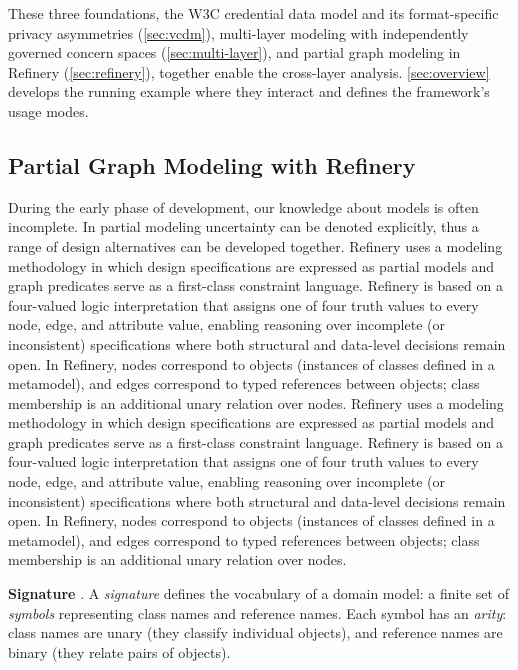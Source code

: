 These three foundations, the W3C credential data model and its format-specific privacy asymmetries (\autoref{sec:vcdm}), multi-layer modeling with independently governed concern spaces (\autoref{sec:multi-layer}), and partial graph modeling in Refinery (\autoref{sec:refinery}), together enable the cross-layer analysis. \autoref{sec:overview} develops the running example where they interact and defines the framework's usage modes.

\subsection{Partial Graph Modeling with Refinery}\label{sec:refinery}

During the early phase of development, our knowledge about models is often incomplete. In partial modeling \citep{famelisPartialModelsModeling2012} uncertainty can be denoted explicitly, thus a range of design alternatives can be developed together.
Refinery \citep{marussy_refinery_2024} uses a modeling methodology in which design specifications are expressed as partial models and graph predicates serve as a first-class constraint language. Refinery is based on a four-valued logic interpretation \citep{Belnap77useful} that assigns one of four truth values to every node, edge, and attribute value, enabling reasoning over incomplete (or inconsistent) specifications where both structural and data-level decisions remain open. In Refinery, nodes correspond to objects (instances of classes defined in a metamodel), and edges correspond to typed references between objects; class membership is an additional unary relation over nodes.
Refinery \citep{marussy_refinery_2024} uses a modeling methodology in which design specifications are expressed as partial models and graph predicates serve as a first-class constraint language. Refinery is based on a four-valued logic interpretation \citep{Belnap77useful} that assigns one of four truth values to every node, edge, and attribute value, enabling reasoning over incomplete (or inconsistent) specifications where both structural and data-level decisions remain open. In Refinery, nodes correspond to objects (instances of classes defined in a metamodel), and edges correspond to typed references between objects; class membership is an additional unary relation over nodes.

\textbf{Signature} \citep{marussy_refinery_2024}. A \emph{signature} defines the vocabulary of a domain model: a finite set of \emph{symbols} representing class names and reference names. Each symbol has an \emph{arity}: class names are unary (they classify individual objects), and reference names are binary (they relate pairs of objects).

